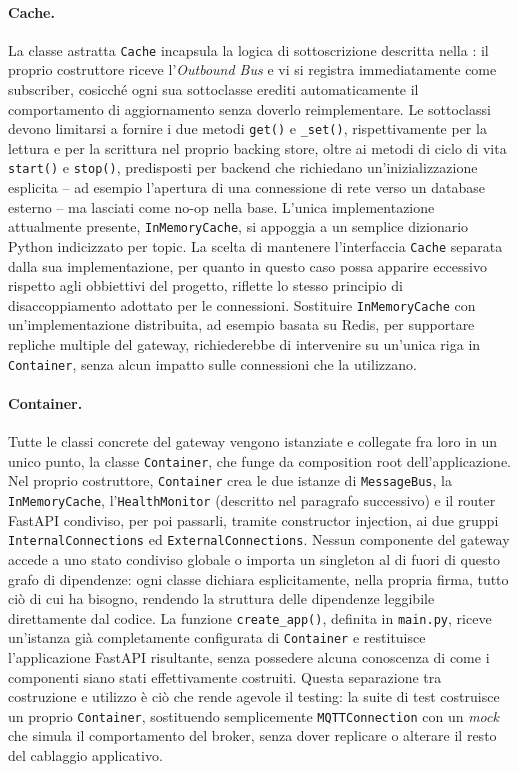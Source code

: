 \paragraph{Cache.}
La classe astratta \texttt{Cache} incapsula la logica di sottoscrizione descritta nella : il proprio costruttore riceve l'\textit{Outbound Bus} e vi si registra immediatamente come subscriber, cosicché ogni sua sottoclasse erediti automaticamente il comportamento di aggiornamento senza doverlo reimplementare. Le sottoclassi devono limitarsi a fornire i due metodi \texttt{get()} e \texttt{\_set()}, rispettivamente per la lettura e per la scrittura nel proprio backing store, oltre ai metodi di ciclo di vita \texttt{start()} e \texttt{stop()}, predisposti per backend che richiedano un'inizializzazione esplicita -- ad esempio l'apertura di una connessione di rete verso un database esterno -- ma lasciati come no-op nella base. L'unica implementazione attualmente presente, \texttt{InMemoryCache}, si appoggia a un semplice dizionario Python indicizzato per topic. La scelta di mantenere l'interfaccia \texttt{Cache} separata dalla sua implementazione, per quanto in questo caso possa apparire eccessivo rispetto agli obbiettivi del progetto, riflette lo stesso principio di disaccoppiamento adottato per le connessioni. Sostituire \texttt{InMemoryCache} con un'implementazione distribuita, ad esempio basata su Redis, per supportare repliche multiple del gateway, richiederebbe di intervenire su un'unica riga in \texttt{Container}, senza alcun impatto sulle connessioni che la utilizzano.

\paragraph{Container.}
Tutte le classi concrete del gateway vengono istanziate e collegate fra loro in un unico punto, la classe \texttt{Container}, che funge da composition root dell'applicazione. Nel proprio costruttore, \texttt{Container} crea le due istanze di \texttt{MessageBus}, la \texttt{InMemoryCache}, l'\texttt{HealthMonitor} (descritto nel paragrafo successivo) e il router FastAPI condiviso, per poi passarli, tramite constructor injection, ai due gruppi \texttt{InternalConnections} ed \texttt{ExternalConnections}. Nessun componente del gateway accede a uno stato condiviso globale o importa un singleton al di fuori di questo grafo di dipendenze: ogni classe dichiara esplicitamente, nella propria firma, tutto ciò di cui ha bisogno, rendendo la struttura delle dipendenze leggibile direttamente dal codice. La funzione \texttt{create\_app()}, definita in \texttt{main.py}, riceve un'istanza già completamente configurata di \texttt{Container} e restituisce l'applicazione FastAPI risultante, senza possedere alcuna conoscenza di come i componenti siano stati effettivamente costruiti. Questa separazione tra costruzione e utilizzo è ciò che rende agevole il testing: la suite di test costruisce un proprio \texttt{Container}, sostituendo semplicemente \texttt{MQTTConnection} con un \textit{mock} che simula il comportamento del broker, senza dover replicare o alterare il resto del cablaggio applicativo.

